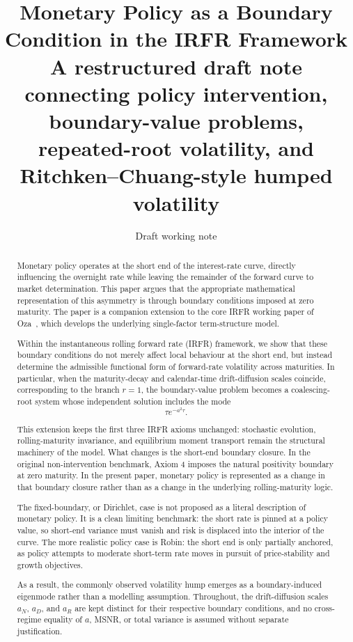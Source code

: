 \documentclass[11pt]{article}
\title{\textbf{Monetary Policy as a Boundary Condition in the IRFR Framework}\\[0.5em]
\large A restructured draft note connecting policy intervention, boundary-value problems, repeated-root volatility, and Ritchken--Chuang-style humped volatility}
\author{Draft working note}
\date{}
\numberwithin{equation}{section}
\begin{document}
\maketitle

\begin{abstract}
Monetary policy operates at the short end of the interest-rate curve, directly influencing the overnight rate while leaving the remainder of the forward curve to market determination. This paper argues that the appropriate mathematical representation of this asymmetry is through boundary conditions imposed at zero maturity. The paper is a companion extension to the core IRFR working paper of Oza~\cite{Oza2026IRFR}, which develops the underlying single-factor term-structure model.

Within the instantaneous rolling forward rate (IRFR) framework, we show that these boundary conditions do not merely affect local behaviour at the short end, but instead determine the admissible functional form of forward-rate volatility across maturities. In particular, when the maturity-decay and calendar-time drift-diffusion scales coincide, corresponding to the branch $r=1$, the boundary-value problem becomes a coalescing-root system whose independent solution includes the mode
\[
\tau e^{-a^2\tau}.
\]

This extension keeps the first three IRFR axioms unchanged: stochastic evolution, rolling-maturity invariance, and equilibrium moment transport remain the structural machinery of the model. What changes is the short-end boundary closure. In the original non-intervention benchmark, Axiom 4 imposes the natural positivity boundary at zero maturity. In the present paper, monetary policy is represented as a change in that boundary closure rather than as a change in the underlying rolling-maturity logic.

The fixed-boundary, or Dirichlet, case is not proposed as a literal description of monetary policy. It is a clean limiting benchmark: the short rate is pinned at a policy value, so short-end variance must vanish and risk is displaced into the interior of the curve. The more realistic policy case is Robin: the short end is only partially anchored, as policy attempts to moderate short-term rate moves in pursuit of price-stability and growth objectives.

As a result, the commonly observed volatility hump emerges as a boundary-induced eigenmode rather than a modelling assumption. Throughout, the drift-diffusion scales $a_N$, $a_D$, and $a_R$ are kept distinct for their respective boundary conditions, and no cross-regime equality of $a$, MSNR, or total variance is assumed without separate justification.
\end{abstract}
\end{document}
